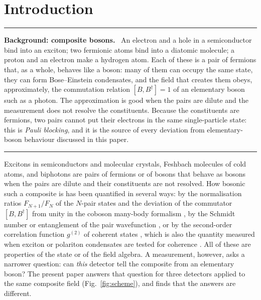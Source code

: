 \documentclass[11pt,a4paper]{article}
\newenvironment{background}[1]{\par\medskip\noindent\hrule\smallskip\noindent\textbf{Background: #1.}\ \ignorespaces}{\par\smallskip\noindent\hrule\medskip}
\begin{document}
\section{Introduction}

\begin{background}{composite bosons}
An electron and a hole in a semiconductor bind into an exciton; two fermionic atoms bind into a diatomic molecule; a proton and an electron make a hydrogen atom. Each of these is a pair of fermions that, as a whole, behaves like a boson: many of them can occupy the same state, they can form Bose--Einstein condensates, and the field that creates them obeys, approximately, the commutation relation $[B,B^\dagger]=1$ of an elementary boson such as a photon. The approximation is good when the pairs are dilute and the measurement does not resolve the constituents. Because the constituents are fermions, two pairs cannot put their electrons in the same single-particle state: this is \emph{Pauli blocking}, and it is the source of every deviation from elementary-boson behaviour discussed in this paper.
\end{background}

Excitons in semiconductors and molecular crystals, Feshbach molecules of cold atoms, and biphotons are pairs of fermions or of bosons that behave as bosons when the pairs are dilute and their constituents are not resolved. How bosonic such a composite is has been quantified in several ways: by the normalisation ratios $F_{N+1}/F_N$ of the $N$-pair states and the deviation of the commutator $[B,B^\dagger]$ from unity in the coboson many-body formalism \cite{Combescot2008,CombescotShiau2015,Shiau2017,Figueiredo2026}, by the Schmidt number or entanglement of the pair wavefunction \cite{Law2005,Chudzicki2010,Tichy2012,Tichy2014}, or by the second-order correlation function $g^{(2)}$ of coherent states \cite{Shiau2017}, which is also the quantity measured when exciton or polariton condensates are tested for coherence \cite{Kasprzak2006,Deng2010,Combescot2017}. All of these are properties of the state or of the field algebra. A measurement, however, asks a narrower question: can \emph{this} detector tell the composite from an elementary boson? The present paper answers that question for three detectors applied to the same composite field (Fig.~\ref{fig:scheme}), and finds that the answers are different.
\end{document}
